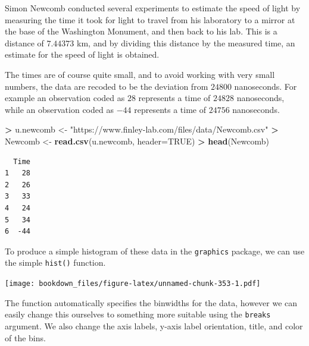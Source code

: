 \documentclass[
]{krantz}
\makeatletter
\newenvironment{Shaded}{\begin{snugshade}}{\end{snugshade}}
\newcommand{\DataTypeTok}[1]{\textcolor[rgb]{0.27,0.27,0.27}{#1}}
\newcommand{\KeywordTok}[1]{\textcolor[rgb]{0.27,0.27,0.27}{\textbf{#1}}}
\newcommand{\NormalTok}[1]{#1}
\newcommand{\OperatorTok}[1]{\textcolor[rgb]{0.43,0.43,0.43}{\textbf{#1}}}
\newcommand{\OtherTok}[1]{\textcolor[rgb]{0.37,0.37,0.37}{#1}}
\newcommand{\StringTok}[1]{\textcolor[rgb]{0.5,0.5,0.5}{#1}}
\newenvironment{kframe}{%
\medskip{}
\setlength{\fboxsep}{.8em}
 \def\at@end@of@kframe{}%
 \ifinner\ifhmode%
  \def\at@end@of@kframe{\end{minipage}}%
  \begin{minipage}{\columnwidth}%
 \fi\fi%
 \def\FrameCommand##1{\hskip\@totalleftmargin \hskip-\fboxsep
 \colorbox{shadecolor}{##1}\hskip-\fboxsep
     \hskip-\linewidth \hskip-\@totalleftmargin \hskip\columnwidth}%
 \MakeFramed {\advance\hsize-\width
   \@totalleftmargin\z@ \linewidth\hsize
   \@setminipage}}%
 {\par\unskip\endMakeFramed%
 \at@end@of@kframe}
\renewenvironment{Shaded}{\begin{kframe}}{\end{kframe}}
\makeatother
\begin{document}
Simon Newcomb conducted several experiments to estimate the speed of light by measuring the time it took for light to travel from his laboratory to a mirror at the base of the Washington Monument, and then back to his lab. This is a distance of \(7.44373\) km, and by dividing this distance by the measured time, an estimate for the speed of light is obtained.

The times are of course quite small, and to avoid working with very small numbers, the data are recoded to be the deviation from \(24800\) nanoseconds. For example an observation coded as \(28\) represents a time of \(24828\) nanoseconds, while an observation coded as \(-44\) represents a time of \(24756\) nanoseconds.

\begin{Shaded}
\begin{Highlighting}[]
\OperatorTok{\textgreater{}}\StringTok{ }\NormalTok{u.newcomb \textless{}{-}}\StringTok{ "https://www.finley{-}lab.com/files/data/Newcomb.csv"}
\OperatorTok{\textgreater{}}\StringTok{ }\NormalTok{Newcomb \textless{}{-}}\StringTok{ }\KeywordTok{read.csv}\NormalTok{(u.newcomb, }\DataTypeTok{header=}\OtherTok{TRUE}\NormalTok{)}
\OperatorTok{\textgreater{}}\StringTok{ }\KeywordTok{head}\NormalTok{(Newcomb)}
\end{Highlighting}
\end{Shaded}

\begin{verbatim}
  Time
1   28
2   26
3   33
4   24
5   34
6  -44
\end{verbatim}

To produce a simple histogram of these data in the \texttt{graphics} package, we can use the simple \texttt{hist()} function.

\begin{Shaded}
\end{Shaded}

\texttt{[image: bookdown\_files/figure-latex/unnamed-chunk-353-1.pdf]}

The function automatically specifies the binwidths for the data, however we can easily change this ourselves to something more suitable using the \texttt{breaks} argument. We also change the axis labels, y-axis label orientation, title, and color of the bins.
\end{document}
